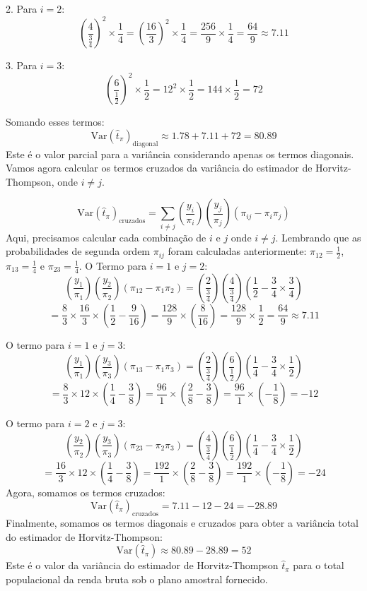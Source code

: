\documentclass[a4paper,11pt,oneside,twocolumn]{Config/milktest}
\begin{document}
{		2. Para \(i = 2\):
		\[
		\left(\frac{4}{\frac{3}{4}}\right)^2 \times \frac{1}{4} = \left(\frac{16}{3}\right)^2 \times \frac{1}{4} = \frac{256}{9} \times \frac{1}{4} = \frac{64}{9} \approx 7.11
		\]
		
		3. Para \(i = 3\):
		\[
		\left(\frac{6}{\frac{1}{2}}\right)^2 \times \frac{1}{2} = 12^2 \times \frac{1}{2} = 144 \times \frac{1}{2} = 72
		\]
		
		Somando esses termos:
		\[
		\text{Var}(\hat{t}_\pi)_{\text{diagonal}} \approx 1.78 + 7.11 + 72 = 80.89
		\]
		Este é o valor parcial para a variância considerando apenas os termos diagonais. Vamos agora calcular os termos cruzados da variância do estimador de Horvitz-Thompson, onde \(i \neq j\).
		
		\[
		\text{Var}(\hat{t}_\pi)_{\text{cruzados}} = \sum_{i \neq j} \left(\frac{y_i}{\pi_i}\right) \left(\frac{y_j}{\pi_j}\right) (\pi_{ij} - \pi_i \pi_j)
		\]
		Aqui, precisamos calcular cada combinação de \(i\) e \(j\) onde \(i \neq j\). Lembrando que as probabilidades de segunda ordem \(\pi_{ij}\) foram calculadas anteriormente: \(\pi_{12} = \frac{1}{2}\), \(\pi_{13} = \frac{1}{4}\) e \(\pi_{23} = \frac{1}{4}\). O Termo para \(i = 1\) e \(j = 2\):
		\[
		\left(\frac{y_1}{\pi_1}\right) \left(\frac{y_2}{\pi_2}\right) (\pi_{12} - \pi_1 \pi_2) = \left(\frac{2}{\frac{3}{4}}\right) \left(\frac{4}{\frac{3}{4}}\right) \left(\frac{1}{2} - \frac{3}{4} \times \frac{3}{4}\right)
		\]
		\[
		= \frac{8}{3} \times \frac{16}{3} \times \left(\frac{1}{2} - \frac{9}{16}\right) = \frac{128}{9} \times \left(\frac{8}{16}\right) = \frac{128}{9} \times \frac{1}{2} = \frac{64}{9} \approx 7.11
		\]
		
		O termo para \(i = 1\) e \(j = 3\): 
		\[
		\left(\frac{y_1}{\pi_1}\right) \left(\frac{y_3}{\pi_3}\right) (\pi_{13} - \pi_1 \pi_3) = \left(\frac{2}{\frac{3}{4}}\right) \left(\frac{6}{\frac{1}{2}}\right) \left(\frac{1}{4} - \frac{3}{4} \times \frac{1}{2}\right)
		\] 
		\[
		= \frac{8}{3} \times 12 \times \left(\frac{1}{4} - \frac{3}{8}\right) = \frac{96}{1} \times \left(\frac{2}{8} - \frac{3}{8}\right) = \frac{96}{1} \times \left(-\frac{1}{8}\right) = -12
		\]
		
		O termo para \(i = 2\) e \(j = 3\): 
		\[
		\left(\frac{y_2}{\pi_2}\right) \left(\frac{y_3}{\pi_3}\right) (\pi_{23} - \pi_2 \pi_3) = \left(\frac{4}{\frac{3}{4}}\right) \left(\frac{6}{\frac{1}{2}}\right) \left(\frac{1}{4} - \frac{3}{4} \times \frac{1}{2}\right)
		\] 
		\[
		= \frac{16}{3} \times 12 \times \left(\frac{1}{4} - \frac{3}{8}\right) = \frac{192}{1} \times \left(\frac{2}{8} - \frac{3}{8}\right) = \frac{192}{1} \times \left(-\frac{1}{8}\right) = -24
		\] 
		Agora, somamos os termos cruzados: 
		\[
		\text{Var}(\hat{t}_\pi)_{\text{cruzados}} = 7.11 - 12 - 24 = -28.89
		\] 
		Finalmente, somamos os termos diagonais e cruzados para obter a variância total do estimador de Horvitz-Thompson:
		\[
		\text{Var}(\hat{t}_\pi) \approx 80.89 - 28.89 = 52
		\] 
		Este é o valor da variância do estimador de Horvitz-Thompson \(\hat{t}_\pi\) para o total populacional da renda bruta sob o plano amostral fornecido.
		
	}
	
\end{document}
